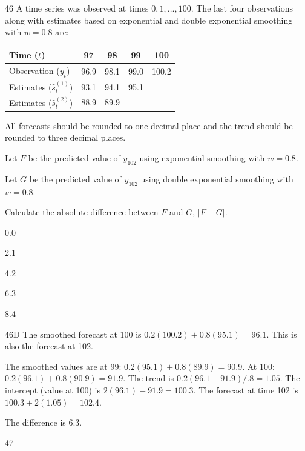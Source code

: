 \begin{question}{46}
A time series was observed at times $0, 1, \ldots, 100$. The last four observations along with estimates based on exponential and double exponential smoothing with $w = 0.8$ are:
\begin{center}
\begin{tabular}{|l|c|c|c|c|}
\hline
Time ($t$) & 97 & 98 & 99 & 100 \\ \hline
Observation ($y_t$) & 96.9 & 98.1 & 99.0 & 100.2 \\ \hline
Estimates ($\hat{s}^{(1)}_t$) & 93.1 & 94.1 & 95.1 & \\ \hline
Estimates ($\hat{s}^{(2)}_t$) & 88.9 & 89.9 & & \\ \hline
\end{tabular}
\end{center}

All forecasts should be rounded to one decimal place and the trend should be rounded to three decimal places.

Let $F$ be the predicted value of $y_{102}$ using exponential smoothing with $w = 0.8$.

Let $G$ be the predicted value of $y_{102}$ using double exponential smoothing with $w = 0.8$.

Calculate the absolute difference between $F$ and $G$, $|F - G|$.

\begin{choices}
\item 0.0
\item 2.1
\item 4.2
\item 6.3
\item 8.4
\end{choices}
\end{question}
\begin{solution}{46}{D}
The smoothed forecast at 100 is $0.2(100.2) + 0.8(95.1) = 96.1$. This is also the forecast at 102.

The smoothed values are at 99: $0.2(95.1) + 0.8(89.9) = 90.9$. At 100: $0.2(96.1) + 0.8(90.9) = 91.9$. The trend is $0.2(96.1 - 91.9)/.8 = 1.05$. The intercept (value at 100) is $2(96.1) - 91.9 = 100.3$. The forecast at time 102 is $100.3 + 2(1.05) = 102.4$.

The difference is 6.3.
\end{solution}

\begin{question}{47}
\deleted
\end{question}

